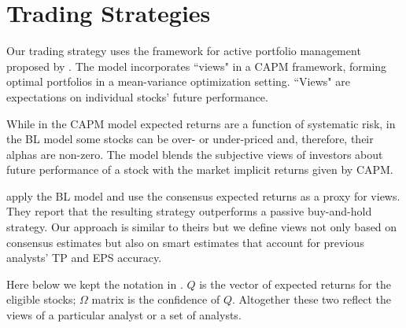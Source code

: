 \documentclass{article}\usepackage[]{graphicx}\usepackage[]{color}
\newcommand{\tr}{\textit{true}}
\newcommand{\naive}{\textit{recent}}
\newcommand{\default}{\textit{all-time}}
\begin{document}





\section{Trading Strategies}
\label{sec:trading}
Our trading strategy uses the framework for  active portfolio management proposed by \cite{black1992}.  The model incorporates ``views" in a CAPM framework, forming optimal portfolios in a mean-variance optimization setting. ``Views" are expectations on individual stocks' future performance.

While in the CAPM model expected returns are a function of systematic risk, in the BL model some stocks can be over- or under-priced and, therefore, their alphas are non-zero. The model blends the subjective views of investors about future performance of a stock with the market implicit returns given by CAPM.

\cite{da2011bl} apply the BL model and use the consensus expected returns as a proxy for views. They report that the resulting strategy outperforms a passive buy-and-hold strategy. Our approach is similar to theirs but we define views not only based on consensus estimates but also on smart estimates that account for previous analysts' TP and EPS accuracy.

Here below we kept the notation in \cite{black1992}.  $Q$ is the vector of  expected returns for the eligible stocks; $\Omega$ matrix is the confidence of $Q$. Altogether these two reflect the views of a particular analyst or a set of analysts.
\end{document}
